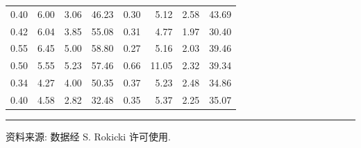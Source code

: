 \begin{mvtable}
{\begin{tabular}{rrrr|rrrr}
0.40 & 6.00 & 3.06 & 46.23 & 0.30 & 5.12 & 2.58 & 43.69\\
0.42 & 6.04 & 3.85 & 55.08 & 0.31 & 4.77 & 1.97 & 30.40\\
0.55 & 6.45 & 5.00 & 58.80 & 0.27 & 5.16 & 2.03 & 39.46\\
0.50 & 5.55 & 5.23 & 57.46 & 0.66 & 11.05 & 2.32 & 39.34\\
0.34 & 4.27 & 4.00 & 50.35 & 0.37 & 5.23 & 2.48 & 34.86\\
0.40 & 4.58 & 2.82 & 32.48 & 0.35 & 5.37 & 2.25 & 35.07\\
\bottomrule
\end{tabular}
}
\end{mvtable}

\vspace{2pt}
\noindent\rule{\linewidth}{0.4pt}

\noindent\small 资料来源: 数据经 S. Rokicki 许可使用.
